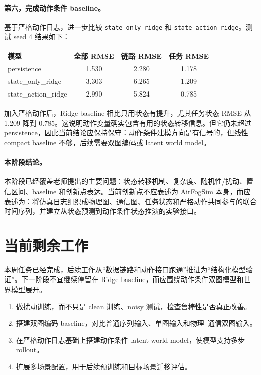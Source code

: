 ﻿\documentclass[UTF8,a4paper,11pt]{ctexart}
\newcommand{\code}[1]{\texttt{#1}}
\begin{document}
\paragraph{第六，完成动作条件 baseline。}
基于严格动作日志，进一步比较 \code{state\_only\_ridge} 和 \code{state\_action\_ridge}。测试 seed 4 结果如下：

\begin{center}
\begin{tabular}{lccc}
\toprule
模型 & 全部 RMSE & 链路 RMSE & 任务 RMSE \\
\midrule
persistence & 1.530 & 2.280 & 1.178 \\
state\_only\_ridge & 3.303 & 6.265 & 1.209 \\
state\_action\_ridge & 2.990 & 5.824 & 0.785 \\
\bottomrule
\end{tabular}
\end{center}

加入严格动作后，Ridge baseline 相比只用状态有提升，尤其任务状态 RMSE 从 1.209 降到 0.785。这说明动作变量确实包含有用的状态转移信息。但它仍未超过 persistence，因此当前结论应保持保守：动作条件建模方向是有信号的，但线性 compact baseline 不够，后续需要双图编码或 latent world model。

\paragraph{本阶段结论。}
本阶段已经覆盖老师提出的主要问题：状态转移机制、复杂度、随机性/扰动、置信区间、baseline 和创新点表达。当前创新点不应表述为 AirFogSim 本身，而应表述为：将仿真日志组织成物理图、通信图、任务状态和严格动作共同参与的联合时间序列，并建立从状态预测到动作条件状态推演的实验接口。
\section{当前剩余工作}

本周任务已经完成，后续工作从“数据链路和动作接口跑通”推进为“结构化模型验证”。下一阶段不宜继续停留在 Ridge baseline，而应围绕动作条件双图模型和世界模型展开。

\begin{enumerate}
  \item 做扰动训练，而不只是 clean 训练、noisy 测试，检查鲁棒性是否真正改善。
  \item 搭建双图编码 baseline，对比普通序列输入、单图输入和物理--通信双图输入。
  \item 在严格动作日志基础上搭建动作条件 latent world model，使模型支持多步 rollout。
  \item 扩展多场景配置，用于后续预训练和目标场景迁移评估。
\end{enumerate}
\end{document}
